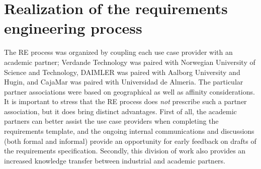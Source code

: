 
\section{Realization of the requirements engineering process}
\label{sec:realization}

The RE process was organized by coupling each use case provider with an
academic partner; Verdande Technology was paired with Norwegian University of Science and Technology, DAIMLER was paired with Aalborg University and Hugin, and CajaMar was paired with
Universidad de Almeria. The particular partner associations were based on geographical as well as affinity
considerations. It is important to stress that the RE process does \emph{not} prescribe such a
partner association, but it does bring distinct advantages. First of all, the academic partners can better assist the use case
providers when completing the requirements template, and the ongoing internal communications and discussions (both formal
and informal) provide an opportunity for early feedback on drafts of the requirements
specification. Secondly, this division of work also provides an increased knowledge transfer between industrial and academic
partners. 






